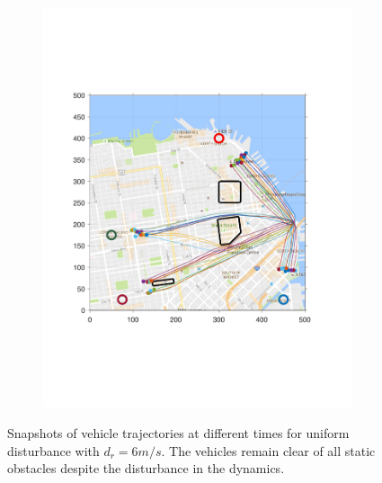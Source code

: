 \begin{figure}[!htb]
\begin{subfigure}{\columnwidth}
  \includegraphics[width=\columnwidth]{figs/sf_d6sep0_s4}
  \subcaption{}
  \label{fig:sf_d6sep0_s4}
\end{subfigure}%
\caption{Snapshots of vehicle trajectories at different times for uniform disturbance with $d_{r} = 6 m/s$. The vehicles remain clear of all static obstacles despite the disturbance in the dynamics.}
\label{fig:trajectories_sf_snapshots}
\end{figure}

